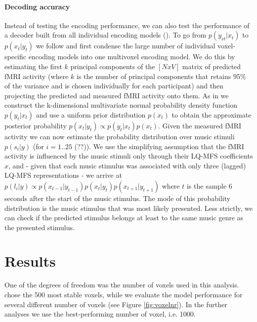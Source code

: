 \paragraph{Decoding accuracy}
%
Instead of testing the encoding performance, we can also test the performance
of a decoder built from all individual encoding models (\cite{NG11}). To go
from $p(y_{vt}|x_{t})$ to $p(x_{t}|y_{t})$ we follow \cite{NG09} and first
condense the large number of individual voxel-specific encoding models into one
multivoxel encoding model. We do this by estimating the first $k$ principal
components of the $[N x V]$ matrix of predicted f{MRI} activity (where $k$ is
the number of principal components that retains 95\% of the variance and is
chosen individually for each participant) and then projecting the predicted and
measured f{MRI} activity onto them. As in \cite{NG09} we construct the
k-dimensional multivariate normal probability density function $p(y_{t}|x_{t})$
and use a uniform prior distribution $p(x_{t})$ to obtain the approximate
posterior probability $p(x_{t}|y_{t}) \propto p(y_{t}|x_{t})p(x_{t})$. Given
the measured f{MRI} activity we can now estimate the probability distribution
over music stimuli $p(s_{i}|y)$ (for $i=1..25$ (??)). We use the simplifying
assumption that the f{MRI} activity is influenced by the music stimuli only
through their LQ-MFS coefficients $x$, and - given that each music stimulus was
associated with only three (lagged) LQ-MFS representations - we arrive at
$p(l_{i}|y) \propto p(x_{t-1}|y_{t-1})p(x_{t}|y_{t})p(x_{t+1}|y_{t+1})$ where
$t$ is the sample 6 seconds after the start of the music stimulus. The mode of
this probability distribution is the music stimulus that was most likely
presented. Less strictly, we can check if the predicted stimulus belongs at
least to the same music genre as the presented stimulus. 

\section*{Results}
%
 One of the degrees
of freedom was the number of voxels used in this analysis. \cite{ML08} chose
the 500 most stable voxels, while we evaluate the model performance for several
different number of voxels (see Figure \ref{fig:voxelnr}). In the further
analyses we use the best-performing number of voxel, i.e. 1000.

